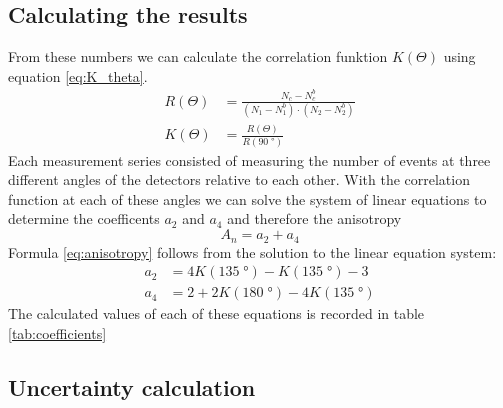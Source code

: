 \subsection{Calculating the results}

From these numbers we can calculate the correlation funktion $K(\Theta)$ using equation \ref{eq:K_theta}.
\begin{align}
	R(\Theta) &= \frac{N_c - N_c^b}{(N_1 - N_1^b)\cdot (N_2 - N_2^b)}\\
	K(\Theta) &= \frac{R(\Theta)}{R(90\;\si{\degree})}
	\label{eq:K_theta}
\end{align}
Each measurement series consisted of measuring the number of events at three different angles of the detectors relative to each other. With the correlation function at each of these angles we can solve the system of linear equations to determine the coefficents $a_2$ and $a_4$ and therefore the anisotropy
\begin{equation}
	A_n = a_2 + a_4
	\label{eq:anisotropy}
\end{equation}
Formula \ref{eq:anisotropy} follows from the solution to the linear equation system:
\begin{align}
	a_2 &= 4K(135\;\si{\degree}) - K(135\;\si{\degree}) - 3\\
	a_4 &= 2 + 2K(180\;\si{\degree}) - 4K(135\;\si{\degree})
\end{align}
The calculated values of each of these equations is recorded in table \ref{tab:coefficients}

\subsection{Uncertainty calculation}

